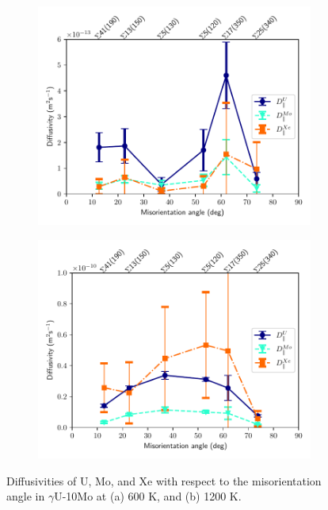 \documentclass{elsarticle}
\providecommand{\DIFadd}[1]{{\protect\color{blue} \sf #1}} %
\providecommand{\DIFaddFL}[1]{\DIFadd{#1}} %
\begin{document}
\begin{figure}[!ht]
    \centering
    \begin{subfigure}{0.49\textwidth}
        \centering
        \caption{}
        \includegraphics[width=\textwidth]{DvsTilt_600K.pdf}
    \end{subfigure}
    \begin{subfigure}{0.49\textwidth}
        \centering
        \caption{}
        \includegraphics[width=\textwidth]{DvsTilt_1200K.pdf}
    \end{subfigure}
\caption{\DIFaddFL{Diffusivities of U, Mo, and Xe with respect to the misorientation angle in $\gamma$U-10Mo at (a) 600 K, and (b) 1200 K.}}
\label{fig:dvstilt}
\end{figure}
\end{document}
